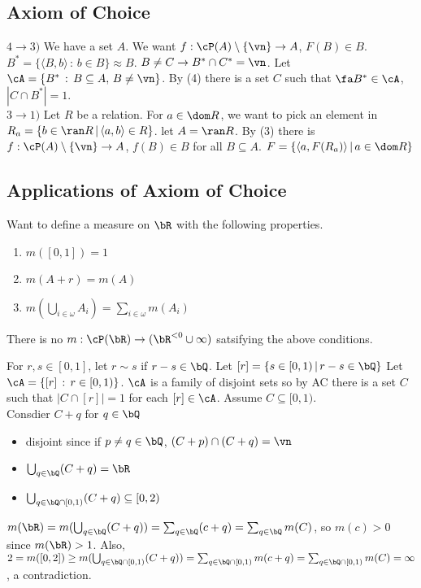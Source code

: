 
\subsection{Axiom of Choice}

\begin{pf}[Pf (cont)]
    $4 \to 3)$ We have a set $A$. We want $f: \cP(A) \setminus \{\vn\} \to A$, $F(B) \in B$. $B^* = \{ \langle B, b \rangle \, : \, b \in B \} \approx B$. $B \neq C \to B^* \cap C^* = \vn$. Let $\cA = \{B^* \, : \, B \subseteq A, \, B \neq \vn\}$. By (4) there is a set $C$ such that $\fa B^* \in \cA$, $|C \cap B^*| = 1$. \\
    $3 \to 1)$ Let $R$ be a relation. For $a \in \dom R$, we want to pick an element in $R_a = \{b \in \ran R \, | \, \langle a, b \rangle \in R \}$. let $A = \ran R$. By (3) there is $f: \cP(A) \setminus \{ \vn\} \to A$, $f(B) \in B$ for all $B \subseteq A$. $F = \{ \langle a , F(R_a) \rangle \, | \, a \in \dom R\}$ 
\end{pf}

\subsection{Applications of Axiom of Choice}

Want to define a measure on $\bR$ with the following properties. 
\begin{enumerate}
    \item $m([0,1])=1$
    \item $m(A + r) = m(A)$
    \item $m(\bigcup_{i \in \omega}A_i) = \sum_{i \in \omega}m(A_i)$
\end{enumerate}

\begin{theorem}
    There is no $m: \cP(\bR) \to (\bR^{<0} \cup \infty)$ satsifying the above conditions. 
\end{theorem}

\begin{pf}
    For $r, s \in [0,1]$, let $r \sim s$ if $r -s \in \bQ$. Let $[r] = \{s \in [0,1) \, | \, r -s \in \bQ\}$ Let $\cA = \{[r] \, : \, r \in [0,1) \}$. $\cA$ is a family of disjoint sets so by AC there is a set $C$ such that $|C \cap [r]| = 1$ for each $[r] \in \cA$. Assume $C \subseteq [0,1)$. \\
    Consdier $C + q$ for $q \in \bQ$ 
    \begin{itemize}
        \item disjoint since if $p \neq q \in \bQ$, $(C + p) \cap (C + q) = \vn$ 
        \item $\bigcup_{q \in \bQ}(C+q) = \bR$ 
        \item $\bigcup_{q \in \bQ \cap [0,1)} (C+q) \subseteq [0,2)$ 
    \end{itemize}
    $m(\bR) = m( \bigcup_{q \in \bQ} (C+q)) = \sum_{q \in \bQ} (c+q) = \sum_{q \in \bQ}m(C)$, so $m(c)>0$ since $m(\bR) >1$. Also, $2 = m([0,2]) \ge m(\bigcup_{q \in \bQ \cap [0,1)} (C+q)) = \sum_{q \in \bQ \cap [0,1)}m(c+q) = \sum_{q \in \bQ \cap [0,1)}m(C) = \infty$, a contradiction. 
\end{pf}
